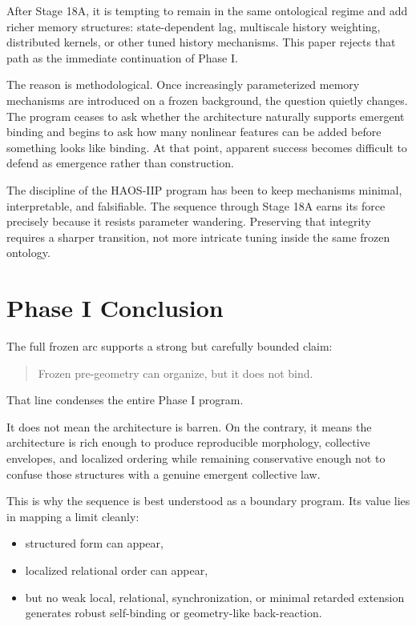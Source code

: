 \documentclass[11pt]{article}
\begin{document}
After Stage 18A, it is tempting to remain in the same ontological regime and add richer memory structures: state-dependent lag, multiscale history weighting, distributed kernels, or other tuned history mechanisms. This paper rejects that path as the immediate continuation of Phase I.

The reason is methodological. Once increasingly parameterized memory mechanisms are introduced on a frozen background, the question quietly changes. The program ceases to ask whether the architecture naturally supports emergent binding and begins to ask how many nonlinear features can be added before something looks like binding. At that point, apparent success becomes difficult to defend as emergence rather than construction.

The discipline of the HAOS-IIP program has been to keep mechanisms minimal, interpretable, and falsifiable. The sequence through Stage 18A earns its force precisely because it resists parameter wandering. Preserving that integrity requires a sharper transition, not more intricate tuning inside the same frozen ontology.

\section{Phase I Conclusion}

The full frozen arc supports a strong but carefully bounded claim:
\begin{quote}
Frozen pre-geometry can organize, but it does not bind.
\end{quote}

That line condenses the entire Phase I program.

It does not mean the architecture is barren. On the contrary, it means the architecture is rich enough to produce reproducible morphology, collective envelopes, and localized ordering while remaining conservative enough not to confuse those structures with a genuine emergent collective law.

This is why the sequence is best understood as a boundary program. Its value lies in mapping a limit cleanly:
\begin{itemize}
\item structured form can appear,
\item localized relational order can appear,
\item but no weak local, relational, synchronization, or minimal retarded extension generates robust self-binding or geometry-like back-reaction.
\end{itemize}
\end{document}

